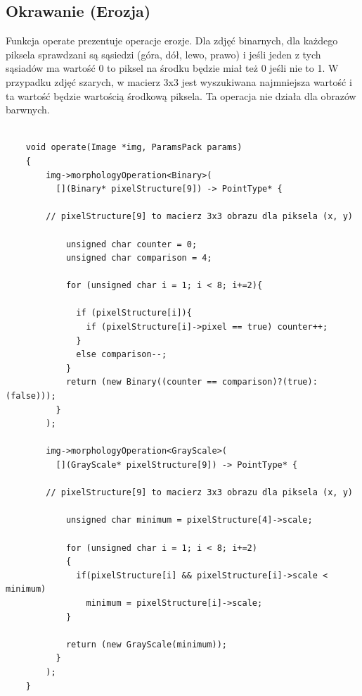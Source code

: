 \documentclass{article}
\begin{document}
\FloatBarrier
\subsection{Okrawanie (Erozja)}
Funkcja operate prezentuje operacje erozje. Dla zdjęć binarnych, dla każdego piksela sprawdzani są sąsiedzi (góra, dół, lewo, prawo) i jeśli jeden z tych sąsiadów ma wartość 0 to piksel na środku będzie miał też 0 jeśli nie to 1. W przypadku zdjęć szarych, w macierz 3x3 jest wyszukiwana najmniejsza wartość i ta wartość będzie wartością środkową piksela. Ta operacja nie działa dla obrazów barwnych.\\
\begin{Verbatim}[frame=single,label=Erozja (Source Code)]

    void operate(Image *img, ParamsPack params)
    {
        img->morphologyOperation<Binary>(
          [](Binary* pixelStructure[9]) -> PointType* {
          
		// pixelStructure[9] to macierz 3x3 obrazu dla piksela (x, y)          
          
            unsigned char counter = 0;
            unsigned char comparison = 4;
            
            for (unsigned char i = 1; i < 8; i+=2){
            
              if (pixelStructure[i]){
                if (pixelStructure[i]->pixel == true) counter++;
              }
              else comparison--;
            }
            return (new Binary((counter == comparison)?(true):(false)));
          }
        );

        img->morphologyOperation<GrayScale>(
          [](GrayScale* pixelStructure[9]) -> PointType* {
          
		// pixelStructure[9] to macierz 3x3 obrazu dla piksela (x, y)           
          
            unsigned char minimum = pixelStructure[4]->scale;
            
            for (unsigned char i = 1; i < 8; i+=2)
            {
              if(pixelStructure[i] && pixelStructure[i]->scale < minimum)
                minimum = pixelStructure[i]->scale;
            }
            
            return (new GrayScale(minimum));
          }
        );
    }
        
\end{Verbatim}
\end{document}
